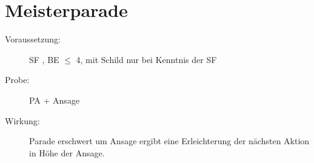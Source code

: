 \section{Meisterparade}
\label{bPA.meisterparade}
\begin{description}
    \item[Voraussetzung:]
    SF , BE\textrm{ ${\leq}$ }4,  mit Schild nur bei Kenntnis der SF 
    \item[Probe:]
        PA + Ansage
    \item[Wirkung:]
        Parade erschwert um Ansage ergibt eine Erleichterung der nächsten Aktion in Höhe der Ansage.
\end{description}
